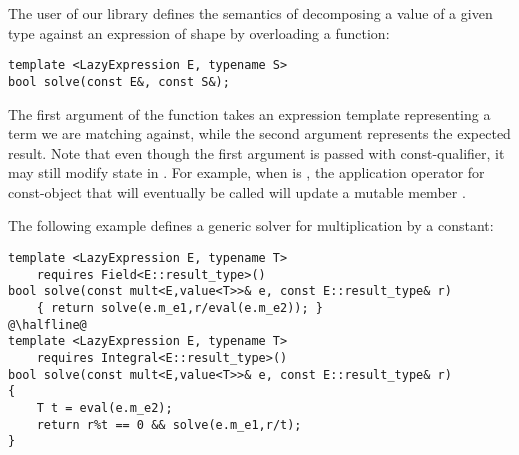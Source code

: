 


The user of our library defines the semantics of decomposing a value of a given 
type  against an expression of shape  by overloading a function: 

\begin{lstlisting}
template <LazyExpression E, typename S> 
bool solve(const E&, const S&);
\end{lstlisting}

\noindent
The first argument of the function takes an expression template representing a 
term we are matching against, while the second argument represents the expected 
result. Note that even though the first argument is passed with const-qualifier, 
it may still modify state in . For example, when  is 
, the application operator for const-object that will eventually be 
called will update a mutable member .

The following example defines a generic solver for multiplication by a 
constant:

\begin{lstlisting}
template <LazyExpression E, typename T> 
    requires Field<E::result_type>()
bool solve(const mult<E,value<T>>& e, const E::result_type& r)
    { return solve(e.m_e1,r/eval(e.m_e2)); }
@\halfline@
template <LazyExpression E, typename T>
    requires Integral<E::result_type>()
bool solve(const mult<E,value<T>>& e, const E::result_type& r) 
{
    T t = eval(e.m_e2);
    return r%t == 0 && solve(e.m_e1,r/t);
}
\end{lstlisting}

